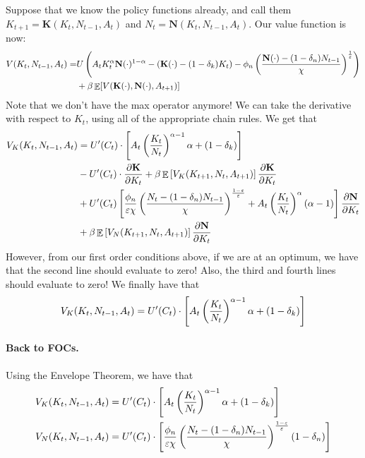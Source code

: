 \documentclass[10pt]{article}
\begin{document}
Suppose that we know the policy functions already, and call them $K_{t+1} = \textbf{K}(K_t,N_{t-1},A_t)$ and $N_t = \textbf{N}(K_t,N_{t-1},A_t)$. Our value function is now:
\begin{align*}
	V(K_t,N_{t-1},A_t) = &U\left( A_tK_t^\alpha \textbf{N}(\cdot)^{1-\alpha} - (\textbf{K}(\cdot) - (1-\delta_k)K_t) - \phi_n \left( \frac{\textbf{N}(\cdot) - (1-\delta_n)N_{t-1}}{\chi}\right)^\frac{1}{\varepsilon}\right) \\
	&+ \beta \mathop{\mathbb{E}}[V(\textbf{K}(\cdot),\textbf{N}(\cdot),A_{t+1})]
\end{align*}
Note that we don't have the max operator anymore! We can take the derivative with respect to $K_t$, using all of the appropriate chain rules. We get that
\begin{align*}
	V_K(K_t,N_{t-1},A_t) &= U'(C_t) \cdot \left[ A_t \left( \frac{K_t}{N_t}\right)^{\alpha - 1}\alpha + (1-\delta_k)\right] \\
	&- U'(C_t) \cdot \frac{\partial \textbf{K}}{\partial K_t} + \beta \mathop{\mathbb{E}} \left[ V_K(K_{t+1},N_t,A_{t+1}) \right]\frac{\partial \textbf{K}}{\partial K_t} \\
	&+ U'(C_t) \left[ \frac{\phi_n}{\varepsilon\chi} \left(\frac{N_t - (1-\delta_n)N_{t-1}}{\chi} \right)^{\frac{1-\varepsilon}{\varepsilon}} + A_t \left( \frac{K_t}{N_t}\right)^\alpha (\alpha - 1)\right] \frac{\partial \textbf{N}}{\partial K_t} \\
	&+ \beta \mathop{\mathbb{E}}\left[ V_N(K_{t+1},N_t,A_{t+1})\right] \frac{\partial \textbf{N}}{\partial K_t}
\end{align*}
However, from our first order conditions above, if we are at an optimum, we have that the second line should evaluate to zero! Also, the third and fourth lines should evaluate to zero! We finally have that
\[
V_K(K_t,N_{t-1},A_t) = U'(C_t) \cdot \left[ A_t \left( \frac{K_t}{N_t}\right)^{\alpha - 1}\alpha + (1-\delta_k)\right]
\]

\paragraph{Back to FOCs.} Using the Envelope Theorem, we have that
\begin{align*}
	V_K(K_t,N_{t-1},A_t) &=  U'(C_t) \cdot \left[ A_t \left( \frac{K_t}{N_t}\right)^{\alpha - 1}\alpha + (1-\delta_k)\right] \\
	V_N(K_t,N_{t-1},A_t) &= U'(C_t) \cdot \left[ \frac{\phi_n}{\varepsilon\chi} \left( \frac{N_t - (1-\delta_n)N_{t-1}}{\chi}\right)^\frac{1-\varepsilon}{\varepsilon}(1-\delta_n)\right]
\end{align*}
\end{document}

